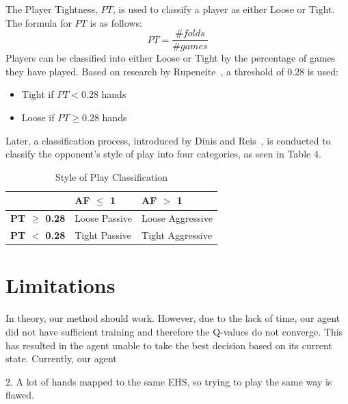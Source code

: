 \documentclass{article}
\begin{document}
The Player Tightness, $PT$, is used to classify a player as either Loose or Tight. The formula for $PT$ is as follows:
\begin{displaymath}
  PT =  \frac{\text{\# }folds}{\text{\# }games} 
\end{displaymath}
\noindent Players can be classified into either Loose or Tight by the percentage of games they have played. Based on research by Rupeneite~, a threshold of 0.28 is used:
\begin{itemize}
	\item Tight if $PT < 0.28$ hands
	\item Loose if $PT \geq 0.28$ hands
\end{itemize}

Later, a classification process, introduced by Dinis and Reis~, is conducted to classify the opponent's style of play into four categories, as seen in Table 4.

\begin{table}[h!]
  \begin{center}
    \begin{tabular}{p{1.5cm}|p{2cm}|p{2cm}}
      \textbf{} & \textbf{AF $\leq$ 1} & \textbf{AF $>$ 1} \\
      \hline
      \textbf{PT $\geq$ 0.28} & Loose \newline Passive & Loose \newline Aggressive \\
      \hline
      \textbf{PT $<$ 0.28} & Tight \newline Passive & Tight \newline Aggressive \\
    \end{tabular}
    \caption{Style of Play Classification}
    \label{tab:table4}
  \end{center}
\end{table}

\section{Limitations}

In theory, our method should work. However, due to the lack of time, our agent did not have sufficient training and therefore the Q-values do not converge. This has resulted in the agent unable to take the best decision based on its current state. Currently, our agent

2. A lot of hands mapped to the same EHS, so trying to play the same way is flawed.
\end{document}
